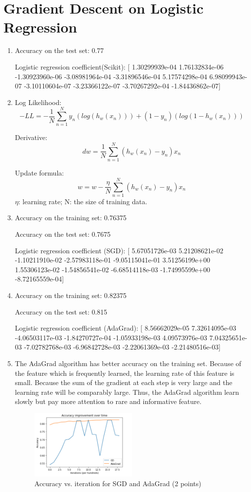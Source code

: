 \section{Gradient Descent on Logistic Regression}

\begin{enumerate}
    \item Accuracy on the test set:  0.77
    
    Logistic regression coefficient(Scikit):
    [ 1.30299939e-04  1.76132834e-06 -1.30923960e-06 -3.08981964e-04
  -3.31896546e-04  5.17574298e-04  6.98099943e-07 -3.10110604e-07
  -3.23366122e-07 -3.70267292e-04 -1.84436862e-07]
    \item 
    Log Likelihood:
    $$
    -LL = -\frac{1}{N} \sum_{n = 1}^{N}y_n(log(h_w(x_n))) + (1-y_n) (log(1-h_w(x_n)))
    $$
    
    Derivative:
    $$
    dw = \frac{1}{N}\sum_{n = 1}^{N}(h_w(x_n)-y_n)x_n 
    $$
    
    Update formula:
    $$
    w = w-\frac{\eta}{N}\sum_{n = 1}^{N}(h_w(x_n)-y_n)x_n
    $$ 
    $\eta$: learning rate; N: the size of training data.
    \item Accuracy on the training set: 0.76375
    
    Accuracy on the test set: 0.7675
    
    Logistic regression coefficient (SGD):
    [ 5.67051726e-03  5.21208621e-02 -1.10211910e-02 -2.57983118e-01
  -9.05115041e-01  3.51256199e+00  1.55306123e-02 -1.54856541e-02
  -6.68514118e-03 -1.74995599e+00 -8.72165559e-04]
  
    \item Accuracy on the training set: 0.82375
    
    Accuracy on the test set: 0.815
    
    Logistic regression coefficient (AdaGrad):
    [ 8.56662029e-05  7.32614095e-03 -4.06503117e-03 -1.84270727e-04
  -1.05933198e-03  4.09573976e-03  7.04325651e-03 -7.02782768e-03
  -6.96842728e-03 -2.22061369e-03 -2.21480516e-03]
    \item 
    The AdaGrad algorithm has better accuracy on the training set. Because of the feature which is frequently learned, the learning rate of this feature is small. Because the sum of the gradient at each step is very large and the learning rate will be comparably large. Thus, the AdaGrad algorithm learn slowly but pay more attention to rare and informative feature.
    \begin{figure}[H]
    \caption{Accuracy vs. iteration for SGD and AdaGrad (2 points)}
        \centering            \includegraphics[width=0.5\textwidth]{images/8.png}
    \end{figure}
    
\end{enumerate}
